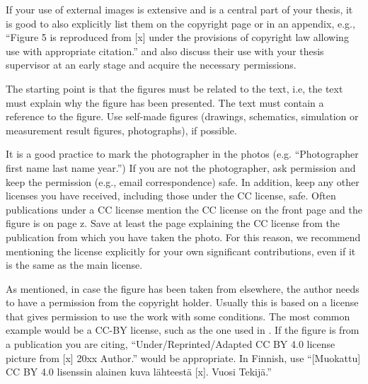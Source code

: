 If your use of external images is extensive and is a central part of
your thesis, it is good to also explicitly list them on the copyright
page or in an appendix, e.g., ``Figure 5 is reproduced from [x] under
the provisions of copyright law allowing use with appropriate
citation.'' and also discuss their use with your thesis supervisor at
an early stage and acquire the necessary permissions.

The starting point is that the figures must be related to the text,
i.e, the text must explain why the figure has been presented. The text
must contain a reference to the figure. Use self-made figures
(drawings, schematics, simulation or measurement result figures,
photographs), if possible.

It is a good practice to mark the photographer in the photos
(e.g. “Photographer first name last name year.”) If you are not the
photographer, ask permission and keep the permission (e.g., email
correspondence) safe. In addition, keep any other licenses you have
received, including those under the CC license, safe. Often
publications under a CC license mention the CC license on the front
page and the figure is on page z. Save at least the page explaining
the CC license from the publication from which you have taken the
photo. For this reason, we recommend mentioning the license explicitly
for your own significant contributions, even if it is the same as
the main license.

As mentioned, in case the figure has been taken from elsewhere, the
author needs to have a permission from the copyright holder. Usually
this is based on a license that gives permission to use the work with
some conditions. The most common example would be a CC-BY license,
such as the one used in . If the figure is from a
publication you are citing, ``Under/Reprinted/Adapted CC BY 4.0 license
picture from [x] \textcopyright 20xx Author.'' would be
appropriate. In Finnish, use ``[Muokattu] CC BY 4.0 lisenssin alainen
kuva lähteestä [x]. \textcopyright Vuosi Tekijä.''

